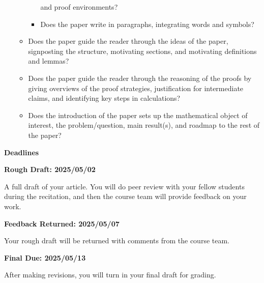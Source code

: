 \documentclass{article}
\begin{document}
\begin{itemize}
\begin{itemize}
\begin{itemize}
                            and proof environments?
                        \item
                            Does the paper write in paragraphs,
                            integrating words and symbols?
                    \end{itemize}
                \item
                    Does the paper guide the reader through the ideas of the
                    paper, signposting the structure, motivating sections, and
                    motivating definitions and lemmas?
                \item
                    Does the paper guide the reader through the reasoning of
                    the proofs by giving overviews of the proof strategies,
                    justification for intermediate claims,
                    and identifying key steps in calculations?
                \item
                    Does the introduction of the paper sets up the
                    mathematical object of interest, the problem/question,
                    main result(s), and roadmap to the rest of the paper?
            \end{itemize}
    \end{itemize}
    \par\hfill\par
    \textbf{\Large{Deadlines}}
    \par\hfill\par
    \textbf{Rough Draft: 2025/05/02}
    \par
    A full draft of your article. You will do peer review with your fellow
    students during the recitation, and then the course team will provide
    feedback on your work.
    \par\hfill\par
    \textbf{Feedback Returned: 2025/05/07}
    \par
    Your rough draft will be returned with comments from the course team.
    \par\hfill\par
    \textbf{Final Due: 2025/05/13}
    \par
    After making revisions, you will turn in your final draft for grading.
\end{document}
